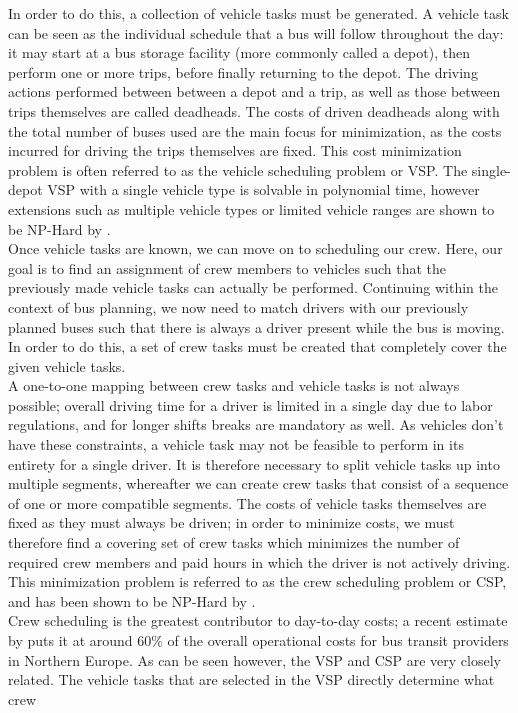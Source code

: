 \documentclass[]{article}
\begin{document}
In order to do this, a collection of vehicle tasks must be generated. A vehicle task can be seen as the individual schedule that a bus will follow throughout the day: it may start at a bus storage facility (more commonly called a depot), then perform one or more trips, before finally returning to the depot. The driving actions performed between between a depot and a trip, as well as those between trips themselves are called deadheads. The costs of driven deadheads along with the total number of buses used are the main focus for minimization, as the costs incurred for driving the trips themselves are fixed. This cost minimization problem is often referred to as the vehicle scheduling problem or VSP. The single-depot VSP with a single vehicle type is solvable in polynomial time, however extensions such as multiple vehicle types or limited vehicle ranges are shown to be NP-Hard by \citet{Bodin1983}. \\
Once vehicle tasks are known, we can move on to scheduling our crew. Here, our goal is to find an assignment of crew members to vehicles  such that the previously made vehicle tasks can actually be performed. Continuing within the context of bus planning, we now need to match drivers with our previously planned buses such that there is always a driver present while the bus is moving. In order to do this, a set of crew tasks must be created that completely cover the given vehicle tasks. \\ 
A one-to-one mapping between crew tasks and vehicle tasks is not always possible; overall driving time for a driver is limited in a single day due to labor regulations, and for longer shifts breaks are mandatory as well. As vehicles don't have these constraints, a vehicle task may not be feasible to perform in its entirety for a single driver. It is therefore necessary to split vehicle tasks up into multiple segments, whereafter we can create crew tasks that consist of a sequence of one or more compatible segments. The costs of vehicle tasks themselves are fixed as they must always be driven; in order to minimize costs, we must therefore find a covering set of crew tasks which minimizes the number of required crew members and paid hours in which the driver is not actively driving. This minimization problem is referred to as the crew scheduling problem or CSP, and has been shown to be NP-Hard by \citet{Fischetti1989}. \\ 
Crew scheduling is the greatest contributor to day-to-day costs; a recent estimate by \citet{Perumal2019Crew} puts it at around 60\% of the overall operational costs for bus transit providers in Northern Europe. As can be seen however, the VSP and CSP are very closely related. The vehicle tasks that are selected in the VSP directly determine what crew
\end{document}
